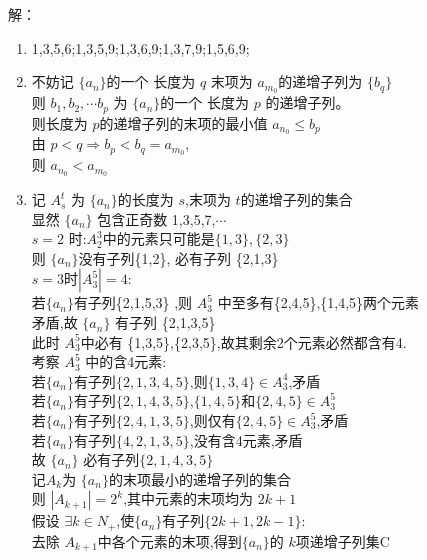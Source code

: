 \documentclass[class=ctexart,crop=false]{standalone}
\begin{document}
解：
\begin{enumerate}[label=(\Roman*)]
    \item 1,3,5,6;1,3,5,9;1,3,6,9;1,3,7,9;1,5,6,9;
    \item 不妨记 $\{a_n\} $的一个 长度为 $q$ 末项为 $a_{m_0}$的递增子列为 $\{b_q\} $\\
        则 $b_1,b_2,\cdots b_p$ 为 $\{a_n\} $的一个 长度为 $p$ 的递增子列。\\
        则长度为 $p$的递增子列的末项的最小值 $a_{n_0} \leqslant b_p $\\ 
        由 $p<q \Rightarrow b_p<b_q=a_{m_0}$,\\
        则 $a_{n_0} < a_{m_0}$\par
    \item  
        记 $A_s^t$ 为 $\{a_n\} $的长度为 $s$,末项为 $t$的递增子列的集合 \\
        显然 $\{a_n\} $ 包含正奇数 1,3,5,7,$\cdots$\\
        $ s=2 $ 时:$A_2^3$中的元素只可能是$ \{1,3\}, \{2,3\}$\\
        则 $\{a_n\} $没有子列\{1,2\}, 必有子列 \{2,1,3\}\\
        $s=3$时$|A_3^5|=4$:\\
        若$\{a_n\} $有子列\{2,1,5,3\} ,则 $A_3^5$ 中至多有\{2,4,5\},\{1,4,5\}两个元素\\
        矛盾,故 $\{a_n\} $ 有子列 \{2,1,3,5\} \\
        此时 $A_3^5$中必有 \{1,3,5\},\{2,3,5\},故其剩余2个元素必然都含有4.\\
        考察 $A_3^5$ 中的含4元素:\\
        若$\{a_n\} $有子列$\{2,1,3,4,5\}$,则$\{1,3,4\}\in A_3^4 $,矛盾\\
        若$\{a_n\} $有子列$\{2,1,4,3,5\}$,$\{1,4,5\}$和$\{2,4,5\}\in A_3^5$\\
        若$\{a_n\} $有子列$\{2,4,1,3,5\}$,则仅有$\{2,4,5\}\in A_3^5$,矛盾\\
        若$\{a_n\} $有子列$\{4,2,1,3,5\}$,没有含4元素,矛盾\\
        故 $\{a_n\} $ 必有子列$\{2,1,4,3,5\}$\\
        记$A_k$为 $\{a_n\} $的末项最小的递增子列的集合\\
        则 $|A_{k+1}|=2^{k}$,其中元素的末项均为 $2k+1$\\
        假设 $ \exists k \in N_+$,使$\{a_n\}$有子列$\{2k+1,2k-1\}:$\\
        去除 $A_{k+1}$中各个元素的末项,得到$\{a_n\} $的 $k$项递增子列集C\\

\end{enumerate}
\end{document}

